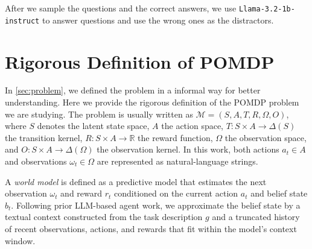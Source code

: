 \documentclass{article}
\theoremstyle{plain}
\theoremstyle{definition}
\theoremstyle{remark}
\begin{document}
After we sample the questions and the correct answers, we use \texttt{Llama-3.2-1b-instruct} to answer questions and use the wrong ones as the distractors.

\section{Rigorous Definition of POMDP}\label{app:pomdp}
In \cref{sec:problem}, we defined the problem in a informal way for better understanding. Here we provide the rigorous definition of the POMDP problem we are studying. The problem is usually written as $\mathcal{M} = (S, A, T, R, \Omega, O)$, where $S$ denotes the latent state space, $A$ the action space,
$T : S \times A \to \Delta(S)$ the transition kernel, $R : S \times A \to \mathbb{R}$ the reward function, $\Omega$ the observation space, and $O : S \times A \to \Delta(\Omega)$ the observation kernel. In this work, both actions $a_t \in A$ and observations $\omega_t \in \Omega$ are represented as natural-language strings.

A \emph{world model} is defined as a predictive model that estimates the next observation $\omega_t$ and reward $r_t$ conditioned on the current action $a_t$
and belief state $b_t$. Following prior LLM-based agent work, we approximate the belief state by a textual context constructed from the task description $g$ and a truncated history of recent observations, actions, and rewards that fit within the model’s context window.
\end{document}
